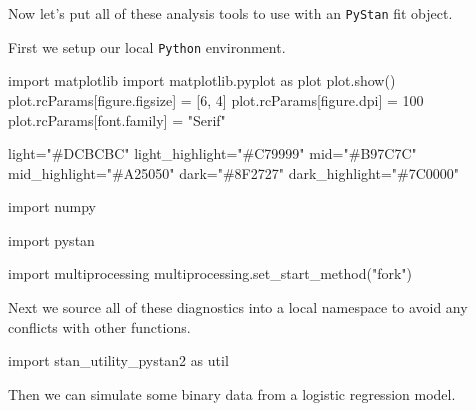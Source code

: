 \documentclass[
  letterpaper,
  DIV=11,
  numbers=noendperiod]{scrartcl}
\newenvironment{Shaded}{\begin{snugshade}}{\end{snugshade}}
\newcommand{\DecValTok}[1]{\textcolor[rgb]{0.68,0.00,0.00}{#1}}
\newcommand{\ImportTok}[1]{\textcolor[rgb]{0.00,0.46,0.62}{#1}}
\newcommand{\NormalTok}[1]{\textcolor[rgb]{0.00,0.23,0.31}{#1}}
\newcommand{\OperatorTok}[1]{\textcolor[rgb]{0.37,0.37,0.37}{#1}}
\newcommand{\StringTok}[1]{\textcolor[rgb]{0.13,0.47,0.30}{#1}}
\begin{document}
Now let's put all of these analysis tools to use with an \texttt{PyStan}
fit object.

First we setup our local \texttt{Python} environment.

\begin{Shaded}
\begin{Highlighting}[]
\ImportTok{import}\NormalTok{ matplotlib}
\ImportTok{import}\NormalTok{ matplotlib.pyplot }\ImportTok{as}\NormalTok{ plot}
\NormalTok{plot.show()}
\NormalTok{plot.rcParams[}\StringTok{\textquotesingle{}figure.figsize\textquotesingle{}}\NormalTok{] }\OperatorTok{=}\NormalTok{ [}\DecValTok{6}\NormalTok{, }\DecValTok{4}\NormalTok{]}
\NormalTok{plot.rcParams[}\StringTok{\textquotesingle{}figure.dpi\textquotesingle{}}\NormalTok{] }\OperatorTok{=} \DecValTok{100}
\NormalTok{plot.rcParams[}\StringTok{\textquotesingle{}font.family\textquotesingle{}}\NormalTok{] }\OperatorTok{=} \StringTok{"Serif"}

\NormalTok{light}\OperatorTok{=}\StringTok{"\#DCBCBC"}
\NormalTok{light\_highlight}\OperatorTok{=}\StringTok{"\#C79999"}
\NormalTok{mid}\OperatorTok{=}\StringTok{"\#B97C7C"}
\NormalTok{mid\_highlight}\OperatorTok{=}\StringTok{"\#A25050"}
\NormalTok{dark}\OperatorTok{=}\StringTok{"\#8F2727"}
\NormalTok{dark\_highlight}\OperatorTok{=}\StringTok{"\#7C0000"}

\ImportTok{import}\NormalTok{ numpy}

\ImportTok{import}\NormalTok{ pystan}

\ImportTok{import}\NormalTok{ multiprocessing}
\NormalTok{multiprocessing.set\_start\_method(}\StringTok{"fork"}\NormalTok{)}
\end{Highlighting}
\end{Shaded}

Next we source all of these diagnostics into a local namespace to avoid
any conflicts with other functions.

\begin{Shaded}
\begin{Highlighting}[]
\ImportTok{import}\NormalTok{ stan\_utility\_pystan2 }\ImportTok{as}\NormalTok{ util}
\end{Highlighting}
\end{Shaded}

Then we can simulate some binary data from a logistic regression model.
\end{document}
